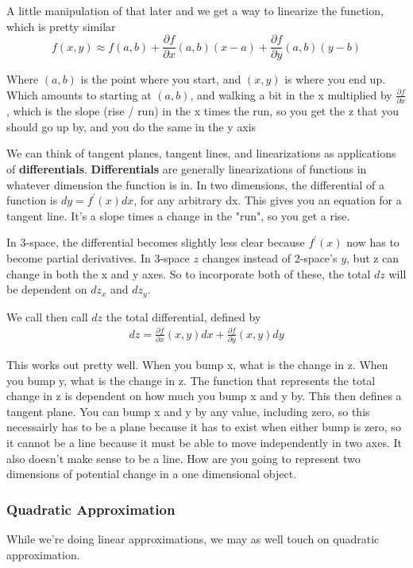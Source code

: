 \documentclass[12pt, letterpaper]{article}
\begin{document}
A little manipulation of that later and we get a way to linearize the function, which is pretty similar
\begin{displaymath}
    f(x, y) \approx f(a, b) + \frac{\partial f}{\partial x}(a, b)(x - a) + \frac{\partial f}{\partial y}(a, b)(y - b)
\end{displaymath}

Where $(a, b)$ is the point where you start, and $(x, y)$ is where you end up. Which amounts to starting at $(a, b)$, and walking a bit in the x multiplied by $\frac{\partial f}{\partial x}$, which is the slope (rise / run) in the x times the run, so you get the z that you should go up by, and you do the same in the y axis

We can think of tangent planes, tangent lines, and linearizations as applications of \textbf{differentials}. \textbf{Differentials} are generally linearizations of functions in whatever dimension the function is in. In two dimensions, the differential of a function is $dy = f^\prime (x)dx$, for any arbitrary dx. This gives you an equation for a tangent line. It's a slope times a change in the "run", so you get a rise.

In 3-space, the differential becomes slightly less clear because $f^\prime (x)$ now has to become partial derivatives. In 3-space $z$ changes instead of 2-space's $y$, but z can change in both the x and y axes. So to incorporate both of these, the total $dz$ will be dependent on $dz_x$ and $dz_y$.

We call then call $dz$ the total differential, defined by
\begin{gather*}
    dz = \frac{\partial f}{\partial x}(x, y)dx + \frac{\partial f}{\partial y}(x, y)dy  
\end{gather*}

This works out pretty well. When you bump x, what is the change in z. When you bump y, what is the change in z. The function that represents the total change in z is dependent on how much you bump x and y by. This then defines a tangent plane. You can bump x and y by any value, including zero, so this necessairly has to be a plane because it has to exist when either bump is zero, so it cannot be a line because it must be able to move independently in two axes. It also doesn't make sense to be a line. How are you going to represent two dimensions of potential change in a one dimensional object.

\subsubsection{Quadratic Approximation}
While we're doing linear approximations, we may as well touch on quadratic approximation.
\end{document}
